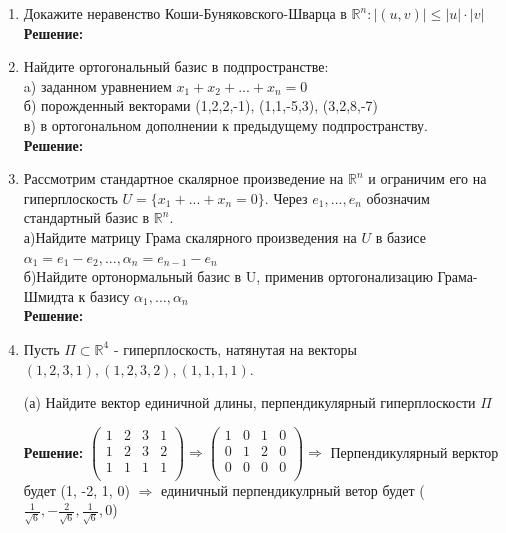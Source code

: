 \documentclass[]{book}
\theoremstyle{definition}
\newcommand{\bb}[1]{\mathbb{#1}}
\renewcommand{\leq}{\leqslant}
\begin{document}
\begin{enumerate}[resume]
\item Докажите неравенство Коши-Буняковского-Шварца в $\bb{R}^{n}: |(u,v)| \leq|u|\cdot|v|$\\
\textbf{Решение:}


\item Найдите ортогональный базис в подпространстве:\\
a) заданном уравнением $ x_1 + x_2+ ... + x_n =0$\\
б) порожденный векторами (1,2,2,-1), (1,1,-5,3), (3,2,8,-7)\\
в) в ортогональном дополнении к предыдущему подпространству.\\
\textbf{Решение:}

\item Рассмотрим стандартное скалярное произведение на $\bb{R}^{n}$ и ограничим его на гиперплоскость $U = \{x_1+...+x_n = 0\}$. Через $e_1,..., e_n$ обозначим стандартный базис в  $\bb{R}^{n}$.\\
а)Найдите матрицу Грама скалярного произведения на $U$ в базисе ${\alpha}_{1}= e_1-e_2, ...,{\alpha}_{n}= e_{n-1}-e_{n} $\\
б)Найдите ортонормальный базис в U, применив ортогонализацию Грама-Шмидта к базису ${\alpha}_{1},...,{\alpha}_{n}$\\
\textbf{Решение:}



\item Пусть $\Pi \subset \bb{R}^4$ - гиперплоскость, натянутая на векторы $(1,2,3,1), (1,2,3,2), (1,1,1,1)$.

(а) Найдите вектор единичной длины, перпендикулярный гиперплоскости $\Pi$

\textbf{Решение:}
$\begin{pmatrix}
1  &  2  &  3  &  1 \\
1  &  2  &  3  &  2 \\
1  &  1  &  1  &  1 \\
\end{pmatrix} \Rightarrow \begin{pmatrix}
1  &  0  &  1  &  0 \\
0  &  1  &  2  &  0 \\
0  &  0  &  0  &  0 \\
\end{pmatrix} \Rightarrow $ Перпендикулярный верктор будет (1, -2, 1, 0) $\Rightarrow$ единичный перпендикулрный ветор будет ($\frac{1}{\sqrt{6}}, {-}\frac{2}{\sqrt{6}}, \frac{1}{\sqrt{6}}, 0$)


\end{enumerate}
\end{document}
